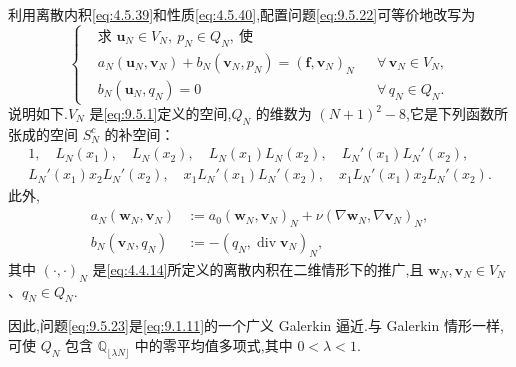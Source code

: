 利用离散内积\eqref{eq:4.5.39}和性质\eqref{eq:4.5.40},配置问题\eqref{eq:9.5.22}可等价地改写为
\begin{equation}\label{eq:9.5.23}
  \left\{
  \begin{aligned}
    &\text{求 }\boldsymbol{u}_N\in V_N,\ p_N\in Q_N,\ \text{使}\\
    &a_N(\boldsymbol{u}_N,\boldsymbol{v}_N)+b_N(\boldsymbol{v}_N,p_N)
       =(\boldsymbol{f},\boldsymbol{v}_N)_N&&\forall\,\boldsymbol{v}_N\in V_N,\\
    &b_N(\boldsymbol{u}_N,q_N)=0&&\forall\,q_N\in Q_N .
  \end{aligned}
  \right.
\end{equation}
说明如下.\(V_N\) 是\eqref{eq:9.5.1}定义的空间,\(Q_N\) 的维数为 \((N+1)^2-8\),它是下列函数所张成的空间 \(S_N^c\) 的补空间：
\begin{equation}\label{eq:9.5.24}
  \begin{gathered}
    1,\quad L_N(x_1),\quad L_N(x_2),\quad L_N(x_1)L_N(x_2),\quad L_N'(x_1)L_N'(x_2),\\
    L_N'(x_1)x_2L_N'(x_2),\quad x_1L_N'(x_1)L_N'(x_2),\quad
           x_1L_N'(x_1)x_2L_N'(x_2).
  \end{gathered}
\end{equation}
此外,
\begin{equation}\label{eq:9.5.25}
  \begin{aligned}
    a_N(\boldsymbol{w}_N,\boldsymbol{v}_N)&:=a_0(\boldsymbol{w}_N,\boldsymbol{v}_N)_N
       +\nu(\nabla\boldsymbol{w}_N,\nabla\boldsymbol{v}_N)_N,\\
    b_N(\boldsymbol{v}_N,q_N)&:=-(q_N,\operatorname{div}\boldsymbol{v}_N)_N,
  \end{aligned}
\end{equation}
其中 \((\cdot,\cdot)_N\) 是\eqref{eq:4.4.14}所定义的离散内积在二维情形下的推广,且 \(\boldsymbol{w}_N,\boldsymbol{v}_N\in V_N\)、\(q_N\in Q_N\).

因此,问题\eqref{eq:9.5.23}是\eqref{eq:9.1.11}的一个广义 Galerkin 逼近.与 Galerkin 情形一样,可使 \(Q_N\) 包含 \(\mathbb Q_{\lfloor\lambda N\rfloor}\) 中的零平均值多项式,其中 \(0<\lambda<1\).

